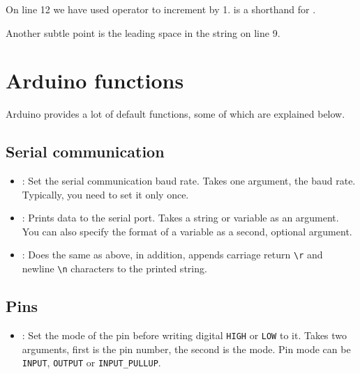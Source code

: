 \documentclass{article}
\begin{document}
			On line 12 we have used \inlncd{+=} operator to increment  by 1.  is a shorthand for .

			Another subtle point is the leading space in the string on line 9.

\section{Arduino functions}

	Arduino provides a lot of default functions, some of which are explained below.

	\subsection{Serial communication}

		\begin{itemize}

		\item {}: Set the serial communication baud rate. Takes one argument, the baud rate. Typically, you need to set it only once.

		\item {}: Prints data to the serial port. Takes a string or variable as an argument. You can also specify the format of a variable as a second, optional argument.

		\item {}: Does the same as above, in addition, appends carriage return \texttt{\textbackslash{}r} and newline \texttt{\textbackslash{}n} characters to the printed string.

		\end{itemize}

	\subsection{Pins}

		\begin{itemize}

		\item {}: Set the mode of the pin before writing digital \texttt{HIGH} or \texttt{LOW} to it. Takes two arguments, first is the pin number, the second is the mode. Pin mode can be \texttt{INPUT}, \texttt{OUTPUT} or \texttt{INPUT\_PULLUP}.

		\end{itemize}
\end{document}
